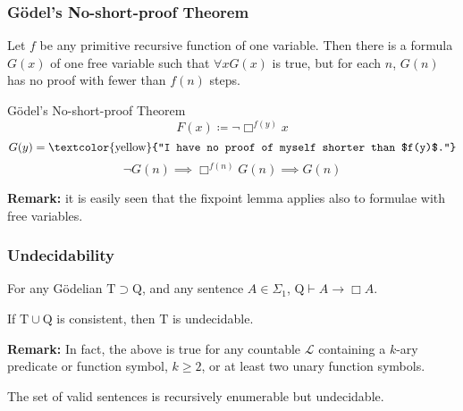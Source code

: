 \documentclass[UTF8,11pt,colorlinks,compress,openany]{beamer}%
\begin{document}
\begin{frame}\frametitle{G\"odel's No-short-proof Theorem}
\setlength\abovedisplayskip{0pt}
\setlength\belowdisplayskip{0pt}\vspace{-1ex}
	\begin{theorem}
		Let $f$ be any primitive recursive function of one variable. Then there is a formula $G(x)$ of one free variable such that $\forall x G(x)$ is true, but for each $n$, $G(n)$ has no proof with fewer than $f(n)$ steps.
	\end{theorem}
	\begin{block}{G\"odel's No-short-proof Theorem}
		\[F(x)\coloneqq \neg\Box ^{f(y)} x\]
		\[G(y)=\text{\textcolor{yellow}{``I have no proof of myself shorter than $f(y)$.''}}\]	
		\[\neg G(n)\implies\Box ^{f(n)} G(n)\implies G(n)\]
	\end{block}
	\textbf{Remark:} it is easily seen that the fixpoint lemma applies also to formulae with free variables.
	\begin{center}
	\end{center}
\end{frame}

\begin{frame}\frametitle{Undecidability}
\setlength\abovedisplayskip{0pt}
\setlength\belowdisplayskip{0pt}
	\begin{center}
	\end{center}
	\begin{theorem}
		For any G\"odelian $\mathrm{T}\supset \mathrm{Q}$, and any sentence $A\in\Sigma_1$, $\mathrm{Q}\vdash A\to\Box A$.
	\end{theorem}
	\begin{theorem}
		If $\mathrm{T}\cup \mathrm{Q}$ is consistent, then $\mathrm{T}$ is undecidable.
	\end{theorem}
	\textbf{Remark:} In fact, the above is true for any countable $\mathscr{L}$ containing a $k$-ary predicate or function symbol, $k\geq 2$, or at least two unary function symbols.
	\begin{center}
	\end{center}
	\begin{theorem}
		The set of valid sentences is recursively enumerable but undecidable.
	\end{theorem}
\end{frame}
\end{document}
